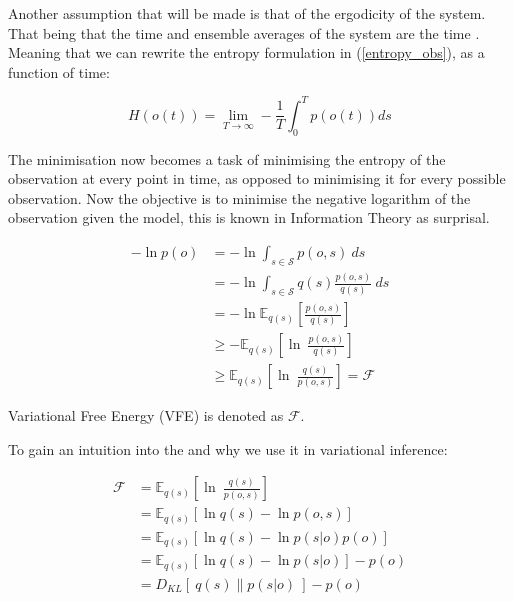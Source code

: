 \documentclass{article}
\begin{document}
Another assumption that will be made is that of the ergodicity of the system. That being that the time and ensemble averages of the system are the time \cite{millidge2019implementing}. Meaning that we can rewrite the entropy formulation in (\ref{entropy_obs}), as a function of time:

\begin{equation}\label{entropy_obs}
	H(o(t)) = \lim_{T \to \infty} - \frac{1}{T} \int_0^T p(o(t)) ds
\end{equation}

The minimisation now becomes a task of minimising the entropy of the observation at every point in time, as opposed to minimising it for every possible observation. Now the objective is to minimise the negative logarithm of the observation given the model, this is known in Information Theory as surprisal.

\begin{equation}
	\begin{aligned}
		- \ln p(o) &= - \ln \int_{s \in \mathcal{S}} p(o, s) \ ds \\
		&= - \ln  \int_{s \in \mathcal{S}} q(s) \frac{ p(o, s)}{q(s)} \ ds \\
		&= - \ln \mathbb{E}_{q(s)}\left[ \frac{p(o, s)}{q(s)} \right] \\
		&\geq - \mathbb{E}_{q(s)}\left[\ln \  \frac{p(o, s)}{q(s)} \right] \\
		&\geq \mathbb{E}_{q(s)}\left[\ln \  \frac{q(s)}{p(o, s)} \right] = \mathcal{F}
	\end{aligned}
\end{equation}

Variational Free Energy (VFE) is denoted as $\mathcal{F}$. 

To gain an intuition into the and why we use it in variational inference:

\begin{equation}
	\begin{aligned}
		\mathcal{F} &= \mathbb{E}_{q(s)}\left[\ln \  \frac{q(s)}{p(o, s)} \right] \\
		&= \mathbb{E}_{q(s)}\left[\ln  q(s) - \ln p(o, s) \right] \\
		&= \mathbb{E}_{q(s)}\left[\ln  q(s) - \ln p(s | o) p(o) \right] \\
		&= \mathbb{E}_{q(s)}\left[\ln  q(s) - \ln p(s | o) \right] - p(o)\\
		&= D_{KL}\left[ \ q(s) \| p(s | o) \ \right] - p(o)\\
	\end{aligned}
\end{equation}
\end{document}
